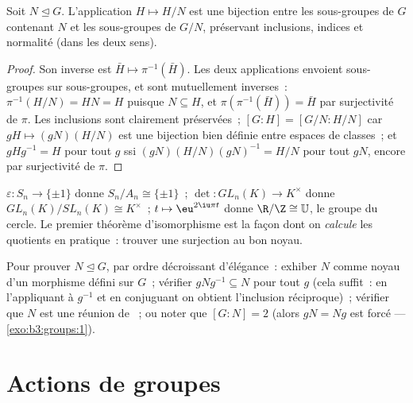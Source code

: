 \begin{theorem}\label{thm:b3:groups:correspondence}
Soit $N \trianglelefteq G$. L'application $H \mapsto H/N$ est une
bijection entre les sous-groupes de $G$ contenant $N$ et les
sous-groupes de $G/N$, préservant inclusions, indices et normalité
(dans les deux sens).
\end{theorem}

\begin{proof}
Son inverse est $\bar H \mapsto \pi^{-1}(\bar H)$. Les deux
applications envoient sous-groupes sur sous-groupes, et sont
mutuellement inverses~: $\pi^{-1}(H/N) = HN = H$ puisque $N
\subseteq H$, et $\pi(\pi^{-1}(\bar H)) = \bar H$ par surjectivité
de $\pi$. Les inclusions sont clairement préservées~; $[G:H] =
[G/N : H/N]$ car $gH \mapsto (gN)(H/N)$ est une bijection bien
définie entre espaces de classes~; et $gHg^{-1} = H$ pour tout $g$
ssi $(gN)(H/N)(gN)^{-1} = H/N$ pour tout $gN$, encore par
surjectivité de $\pi$.
\end{proof}

\begin{example}\label{ex:b3:groups:firstiso}
$\varepsilon \colon S_n \to \{\pm 1\}$ donne $S_n/A_n \cong
\{\pm1\}$~; $\det \colon GL_n(K) \to K^\times$ donne
$GL_n(K)/SL_n(K) \cong K^\times$~; $t \mapsto \eu^{2\iu\pi t}$
donne $\R/\Z \cong \mathbb U$, le groupe du cercle. Le premier
théorème d'isomorphisme est la façon dont on \emph{calcule} les
quotients en pratique~: trouver une surjection au bon noyau.
\end{example}

\begin{method}\label{met:b3:groups:normal}
Pour prouver $N \trianglelefteq G$, par ordre décroissant
d'élégance~: exhiber $N$ comme noyau d'un morphisme défini sur
$G$~; vérifier $gNg^{-1} \subseteq N$ pour tout $g$ (cela
suffit~: en l'appliquant à $g^{-1}$ et en conjuguant on obtient
l'inclusion réciproque)~; vérifier que $N$ est une réunion de
~; ou noter que $[G:N] = 2$ (alors $gN =
Ng$ est forcé --- \cref{exo:b3:groups:1}).
\end{method}

\section{Actions de groupes}

